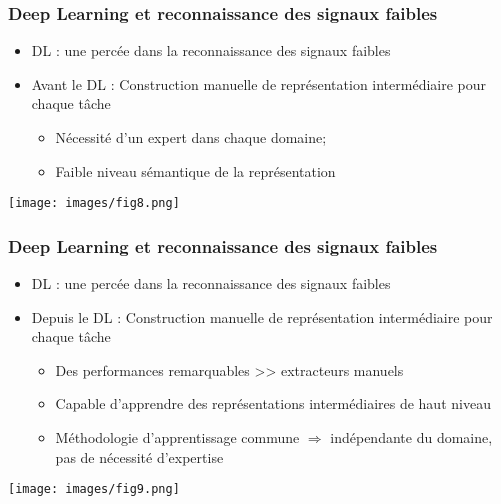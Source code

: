 \documentclass[9pt]{beamer}
\begin{document}
\begin{frame}
\frametitle{Deep Learning et reconnaissance des signaux faibles}

\begin{itemize}
\item DL : une percée dans la reconnaissance des signaux faibles
\item Avant le DL : Construction manuelle de représentation intermédiaire pour chaque tâche
\begin{itemize}
\item Nécessité d'un expert dans chaque domaine;
\item Faible niveau sémantique de la représentation
\end{itemize}
\end{itemize}
\begin{center}
\texttt{[image: images/fig8.png]}
\end{center}

\end{frame}

\begin{frame}
\frametitle{Deep Learning et reconnaissance des signaux faibles}

\begin{itemize}
\item DL : une percée dans la reconnaissance des signaux faibles
\item Depuis le DL : Construction manuelle de représentation intermédiaire pour chaque tâche
\begin{itemize}
\item Des performances remarquables >> extracteurs manuels
\item Capable d'apprendre des représentations intermédiaires de haut niveau
\item Méthodologie d'apprentissage commune $\Rightarrow$ indépendante du domaine, pas de nécessité d'expertise
\end{itemize}
\end{itemize}
\begin{center}
\texttt{[image: images/fig9.png]}
\end{center}

\end{frame}
\end{document}
